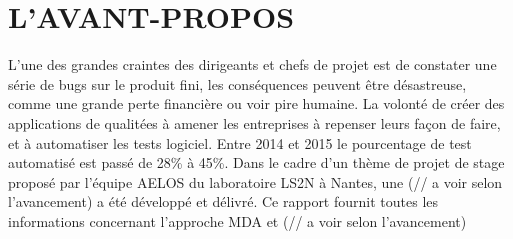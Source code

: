 \documentclass[
10pt, %
a4paper, %
oneside, %
headinclude,footinclude, %
BCOR5mm, %
]{report}
\begin{document}
								
								
	\newpage
	\section*{L’AVANT-PROPOS} 
	L’une des grandes craintes des dirigeants et chefs de projet est de constater une série de bugs sur le produit fini, les conséquences peuvent être désastreuse, comme une grande perte financière ou voir pire humaine.  
	La volonté de créer des applications de qualitées à amener les entreprises à repenser leurs façon de faire, et à automatiser les tests logiciel. Entre 2014 et 2015 le pourcentage de test automatisé est passé de 28\% à 45\%.
	Dans le cadre d’un thème de projet de stage proposé par l’équipe AELOS du laboratoire LS2N à Nantes, une (// a voir selon l’avancement) a été développé et délivré. 
	Ce rapport fournit toutes les informations concernant l’approche MDA et (// a voir selon l’avancement)
								 
								  
	\newpage			
	\dominitoc[n]		
	\tableofcontents 
								  
								  
														
								  
\end{document}
